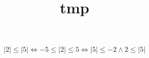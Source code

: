 
\title{tmp}
\setcounter{secnumdepth}{2}



\[
	|2| \le |5|
	\iff -5 \le |2| \le 5
	\iff |5| \le -2 \land 2 \le |5|
\]


